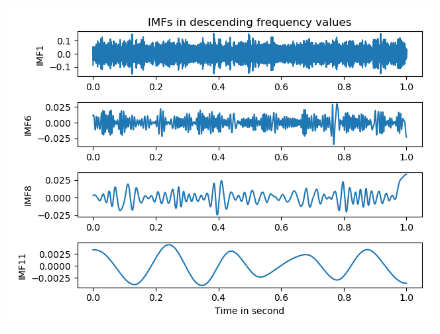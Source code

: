 \documentclass[../Main/thesis.tex]{subfiles}
\begin{document}
\begin{figure}[H]
	\centering
	\includegraphics[width=0.7\linewidth]{../fig/imf_freq_band}
	\caption{}
	\label{fig:imfsfreqband}
\end{figure}

\end{document}
